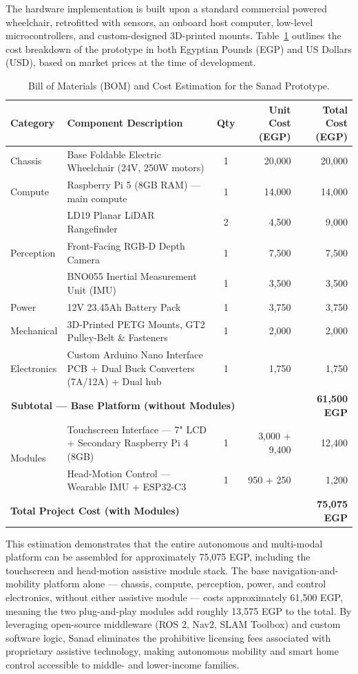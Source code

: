 The hardware implementation is built upon a standard commercial powered wheelchair, retrofitted with sensors, an onboard host computer, low-level microcontrollers, and custom-designed 3D-printed mounts. Table~\ref{table:bom_cost_estimation} outlines the cost breakdown of the prototype in both Egyptian Pounds (EGP) and US Dollars (USD), based on market prices at the time of development.
\begin{table}[H]
\centering
\caption{Bill of Materials (BOM) and Cost Estimation for the Sanad Prototype.}
\label{table:bom_cost_estimation}
\small
\begin{tabularx}{\textwidth}{|l|X|c|r|r|}
\hline
\textbf{Category} & \textbf{Component Description} & \textbf{Qty} & \textbf{Unit Cost (EGP)} & \textbf{Total Cost (EGP)} \\
\hline
Chassis & Base Foldable Electric Wheelchair (24V, 250W motors) & 1 & 20,000 & 20,000 \\
\hline
Compute & Raspberry Pi 5 (8GB RAM) --- main compute & 1 & 14,000 & 14,000 \\
\hline
\multirow{3}{*}{Perception}
 & LD19 Planar LiDAR Rangefinder & 2 & 4,500 & 9,000 \\
\cline{2-5}
 & Front-Facing RGB-D Depth Camera & 1 & 7,500 & 7,500 \\
\cline{2-5}
 & BNO055 Inertial Measurement Unit (IMU) & 1 & 3,500 & 3,500 \\
\hline
Power & 12V 23.45Ah Battery Pack & 1 & 3,750 & 3,750 \\
\hline
Mechanical & 3D-Printed PETG Mounts, GT2 Pulley-Belt \& Fasteners & 1 & 2,000 & 2,000 \\
\hline
Electronics & Custom Arduino Nano Interface PCB + Dual Buck Converters (7A/12A) + Dual hub & 1 & 1,750 & 1,750 \\
\hline
\multicolumn{3}{|r|}{\textbf{Subtotal --- Base Platform (without Modules)}} & & \textbf{61,500 EGP} \\
\hline
\multirow{2}{*}{Modules}
 & Touchscreen Interface --- 7" LCD + Secondary Raspberry Pi 4 (8GB) & 1 & 3,000 + 9,400 & 12,400 \\
\cline{2-5}
 & Head-Motion Control --- Wearable IMU + ESP32-C3 & 1 & 950 + 250 & 1,200 \\
\hline
\multicolumn{3}{|l|}{\textbf{Total Project Cost (with Modules)}} & & \textbf{75,075 EGP} \\
\hline
\end{tabularx}
\end{table}

This estimation demonstrates that the entire autonomous and multi-modal platform can be assembled for approximately 75,075 EGP, including the touchscreen and head-motion assistive module stack. The base navigation-and-mobility platform alone — chassis, compute, perception, power, and control electronics, without either assistive module — costs approximately 61,500 EGP, meaning the two plug-and-play modules add roughly 13,575 EGP to the total. By leveraging open-source middleware (ROS 2, Nav2, SLAM Toolbox) and custom software logic, Sanad eliminates the prohibitive licensing fees associated with proprietary assistive technology, making autonomous mobility and smart home control accessible to middle- and lower-income families.

